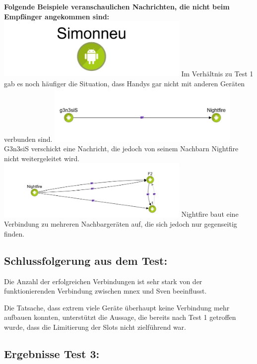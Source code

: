 \textbf{Folgende Beispiele veranschaulichen Nachrichten, die nicht beim
Empfänger angekommen sind:}
\includegraphics[width=0.7\textwidth]{belege/grosstests/Bilder/Grosstest2/Test2Misserfolg1.jpg}
Im Verhältnis zu Test 1 gab es noch häufiger die Situation, dass Handys
gar nicht mit anderen Geräten verbunden sind.
\includegraphics[width=0.7\textwidth]{belege/grosstests/Bilder/Grosstest2/Test2Misserfolg2.jpg}
G3n3siS verschickt eine Nachricht, die jedoch von seinem Nachbarn
Nightfire nicht weitergeleitet wird.
\includegraphics[width=0.7\textwidth]{belege/grosstests/Bilder/Grosstest2/Test2Misserfolg3.jpg}
Nightfire baut eine Verbindung zu mehreren Nachbargeräten auf, die sich
jedoch nur gegenseitig finden.

\clearpage\subsection{Schlussfolgerung aus dem
Test:}\label{schlussfolgerung-aus-dem-test-3}

Die Anzahl der erfolgreichen Verbindungen ist sehr stark von der
funktionierenden Verbindung zwischen mnex und Sven beeinflusst.

Die Tatsache, dass extrem viele Geräte überhaupt keine Verbindung mehr
aufbauen konnten, unterstützt die Aussage, die bereits nach Test 1
getroffen wurde, dass die Limitierung der Slots nicht zielführend war.

\clearpage\subsection{Ergebnisse Test 3:}\label{ergebnisse-test-3}

